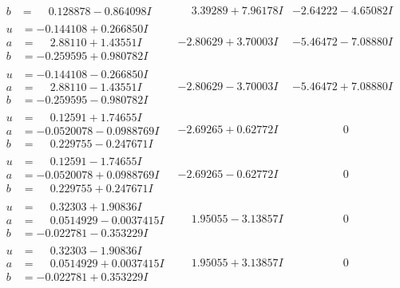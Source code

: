 \documentclass[1p]{elsarticle_modified}
\theoremstyle{definition}
\begin{document}
$$\begin{array}{c|c|c}
\begin{aligned}
b &= \phantom{-}0.128878 - 0.864098 I\end{aligned}
 & \phantom{-}3.39289 + 7.96178 I & -2.64222 - 4.65082 I \\ \hline\begin{aligned}
u &= -0.144108 + 0.266850 I \\
a &= \phantom{-}2.88110 + 1.43551 I \\
b &= -0.259595 + 0.980782 I\end{aligned}
 & -2.80629 + 3.70003 I & -5.46472 - 7.08880 I \\ \hline\begin{aligned}
u &= -0.144108 - 0.266850 I \\
a &= \phantom{-}2.88110 - 1.43551 I \\
b &= -0.259595 - 0.980782 I\end{aligned}
 & -2.80629 - 3.70003 I & -5.46472 + 7.08880 I \\ \hline\begin{aligned}
u &= \phantom{-}0.12591 + 1.74655 I \\
a &= -0.0520078 - 0.0988769 I \\
b &= \phantom{-}0.229755 - 0.247671 I\end{aligned}
 & -2.69265 + 0.62772 I & \phantom{-0.000000 } 0 \\ \hline\begin{aligned}
u &= \phantom{-}0.12591 - 1.74655 I \\
a &= -0.0520078 + 0.0988769 I \\
b &= \phantom{-}0.229755 + 0.247671 I\end{aligned}
 & -2.69265 - 0.62772 I & \phantom{-0.000000 } 0 \\ \hline\begin{aligned}
u &= \phantom{-}0.32303 + 1.90836 I \\
a &= \phantom{-}0.0514929 - 0.0037415 I \\
b &= -0.022781 - 0.353229 I\end{aligned}
 & \phantom{-}1.95055 - 3.13857 I & \phantom{-0.000000 } 0 \\ \hline\begin{aligned}
u &= \phantom{-}0.32303 - 1.90836 I \\
a &= \phantom{-}0.0514929 + 0.0037415 I \\
b &= -0.022781 + 0.353229 I\end{aligned}
 & \phantom{-}1.95055 + 3.13857 I & \phantom{-0.000000 } 0 \\ \hline\begin{aligned}

\end{aligned}
\end{array}$$
\end{document}
